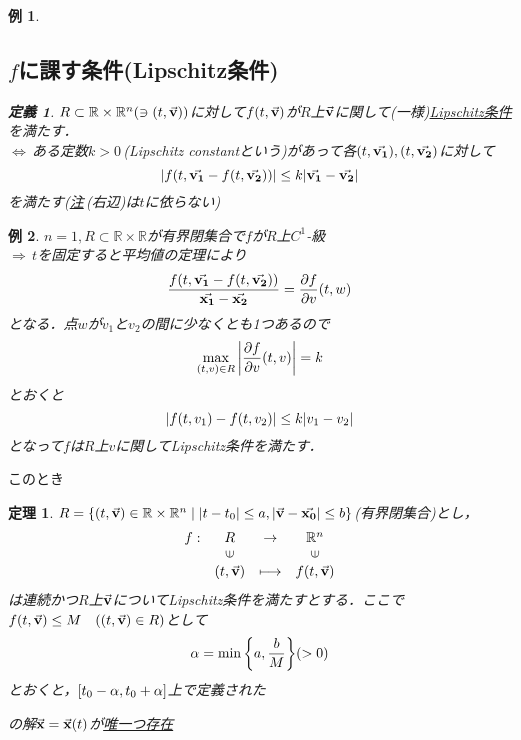 \documentclass[autodetect-engine,dvipdfmx-if-dvi,ja=standard]{bxjsarticle}
\theoremstyle{mystyle1}
\theoremstyle{mystyle2}
\newtheorem{dfn*}{定義}
\newtheorem{thm*}{定理}
\newtheorem{example}{例}
\newcommand{\redast}{\ensuremath{\color{red}\qty(\ast)\color{black}}}
\newcommand{\bbR}{\ensuremath{\mathbb{R}}}
\begin{document}
\begin{example}
  \subsection{$f$に課す条件(Lipschitz条件)}
  \begin{dfn*}
    $R\subset\bbR\times\bbR^n\qty(\ni\qty(t,\va{v}))$に対して$f\qty(t,\va{v})$が$R$上$\va{v}$に関して(一様)\underline{Lipschitz条件}を満たす．\\
    $\Leftrightarrow$\,ある定数$k>0$\,(Lipschitz constantという)があって各$\qty(t,\va{v_1}),\qty(t,\va{v_2})$に対して
    \[\abs{f\qty(t,\va{v_1}-f\qty(t,\va{v_2}))}\leq k\abs{\va{v_1}-\va{v_2}}\]
    を満たす(\underline{注}\,(右辺)は$t$に依らない)
  \end{dfn*}
\end{example}%
\begin{example}
  $n=1,R\subset\bbR\times\bbR$が有界閉集合で$f$が$R$上$C^1$-級\\
  $\Rightarrow$\,$t$を固定すると平均値の定理により
  \[\frac{f\qty(t,\va{v_1}-f\qty(t,\va{v_2}))}{\va{x_1}-\va{x_2}}=\pdv{f}{v}\qty(t,w)\]
  となる．点$w$が$v_1$と$v_2$の間に少なくとも1つあるので
  \[\max_{\qty(t,v)\in R}\abs{\pdv{f}{v}\qty(t,v)}=k\]
  とおくと
  \[\abs{f\qty(t,v_1)-f\qty(t,v_2)}\leq k\abs{v_1-v_2}\]
  となって$f$は$R$上$v$に関してLipschitz条件を満たす．
\end{example}
このとき
\begin{thm*}
  $R=\qty{\qty(t,\va{v})\in\bbR\times\bbR^n\mid\abs{t-t_0}\leq a,\abs{\va{v}-\va{x_0}}\leq b}$(有界閉集合)とし，
  \begin{align*}
    \begin{array}{cccc}
      f: & R                     & \to         & \bbR^n                \\
         & \rotatebox{90}{$\in$} &             & \rotatebox{90}{$\in$} \\
         & \qty(t,\va{v})        & \longmapsto & f\qty(t,\va{v})
    \end{array}
  \end{align*}
  は連続かつ$R$上$\va{v}$についてLipschitz条件を満たすとする．ここで$f\qty(t,\va{v})\leq M\quad\qty(\qty(t,\va{v})\in R)$として
  \[\alpha=\min\qty{a,\frac{b}{M}}\qty(>0)\]
  とおくと，$\qty[t_0-\alpha,t_0+\alpha]$上で定義された
  の解$\va{x}=\va{x}\qty(t)$が\underline{唯一つ存在}
\end{thm*}
\end{document}
